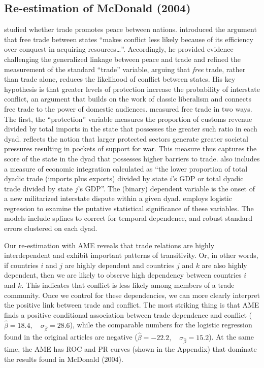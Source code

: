 \subsection{Re-estimation of McDonald (2004)}

\citet{mcdonald:2004} studied whether trade promotes peace between nations.  \citet[p. 547]{mcdonald:2004} introduced the argument that free trade between states ``makes conflict less likely because of its efficiency over conquest in acquiring resources\ldots''. Accordingly, he provided evidence challenging the generalized linkage between peace and trade and refined the measurement of the standard ``trade'' variable, arguing that \textit{free} trade, rather than trade alone, reduces the likelihood of conflict between states. His key hypothesis is that greater levels of protection increase the probability of interstate conflict, an argument that builds on the work of classic liberalism and connects free trade to the power of domestic audiences. \citet{mcdonald:2004} measured free trade in two ways. The first, the ``protection'' variable measures the proportion of customs revenue divided by total imports in the state that possesses the greater such ratio in each dyad. reflects the notion that larger protected sectors generate greater societal pressures resulting in pockets of support for war. This measure thus captures the score of the state in the dyad that possesses higher barriers to trade. \citet[p. 560]{mcdonald:2004} also includes a measure of economic integration  calculated as ``the lower proportion of total dyadic trade (imports plus exports) divided by state $i$'s GDP or total dyadic trade divided by state $j$'s GDP''. The (binary) dependent variable is the onset of a new militarized interstate dispute within a given dyad.  \citet{mcdonald:2004} employs logistic regression to examine the  putative statistical significance of these variables. The models  include splines to correct for temporal dependence, and robust  standard errors clustered on each dyad.

Our re-estimation with AME reveals that trade relations are highly interdependent and exhibit important patterns of transitivity.  Or, in other words, if countries $i$ and $j$ are highly dependent and countries $j$ and $k$ are also highly dependent, then we are likely to observe high dependency between countries $i$ and $k$. This indicates that conflict is less likely among members of a trade community. Once we control for these dependencies, we can more clearly interpret the positive link between trade and conflict.  The most striking thing is that AME finds a positive conditional association between trade dependence and conflict ($\hat{\beta}= 18.4, \quad \sigma_{\hat{\beta}} = 28.6$), while the comparable numbers for the logistic regression found in the original articles are negative ($\hat{\beta}= -22.2, \quad \sigma_{\hat{\beta}} = 15.2$). At the same time, the AME has ROC and PR curves (shown in the Appendix) that dominate the results found in McDonald (2004).

